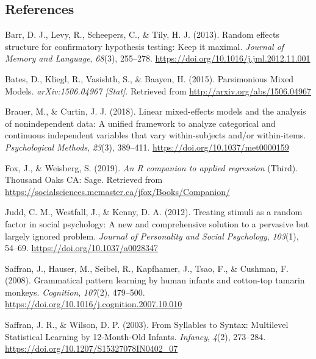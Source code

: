 \begin{appendix}
\hypertarget{references}{%
\subsection*{References}\label{references}}

\begingroup
\setlength{\parindent}{-0.5in}
\setlength{\leftskip}{0.5in}

\hypertarget{refs}{}
\leavevmode\hypertarget{ref-barr2013}{}%
Barr, D. J., Levy, R., Scheepers, C., \& Tily, H. J. (2013). Random
effects structure for confirmatory hypothesis testing: Keep it maximal.
\emph{Journal of Memory and Language}, \emph{68}(3), 255--278.
\url{https://doi.org/10.1016/j.jml.2012.11.001}

\leavevmode\hypertarget{ref-bates2015a}{}%
Bates, D., Kliegl, R., Vasishth, S., \& Baayen, H. (2015). Parsimonious
Mixed Models. \emph{arXiv:1506.04967 {[}Stat{]}}. Retrieved from
\url{http://arxiv.org/abs/1506.04967}

\leavevmode\hypertarget{ref-brauer2018}{}%
Brauer, M., \& Curtin, J. J. (2018). Linear mixed-effects models and the
analysis of nonindependent data: A unified framework to analyze
categorical and continuous independent variables that vary
within-subjects and/or within-items. \emph{Psychological Methods},
\emph{23}(3), 389--411. \url{https://doi.org/10.1037/met0000159}

\leavevmode\hypertarget{ref-fox2019}{}%
Fox, J., \& Weisberg, S. (2019). \emph{An R companion to applied
regression} (Third). Thousand Oaks CA: Sage. Retrieved from
\url{https://socialsciences.mcmaster.ca/jfox/Books/Companion/}

\leavevmode\hypertarget{ref-judd2012}{}%
Judd, C. M., Westfall, J., \& Kenny, D. A. (2012). Treating stimuli as a
random factor in social psychology: A new and comprehensive solution to
a pervasive but largely ignored problem. \emph{Journal of Personality
and Social Psychology}, \emph{103}(1), 54--69.
\url{https://doi.org/10.1037/a0028347}

\leavevmode\hypertarget{ref-saffran2008}{}%
Saffran, J., Hauser, M., Seibel, R., Kapfhamer, J., Tsao, F., \&
Cushman, F. (2008). Grammatical pattern learning by human infants and
cotton-top tamarin monkeys. \emph{Cognition}, \emph{107}(2), 479--500.
\url{https://doi.org/10.1016/j.cognition.2007.10.010}

\leavevmode\hypertarget{ref-saffran2003}{}%
Saffran, J. R., \& Wilson, D. P. (2003). From Syllables to Syntax:
Multilevel Statistical Learning by 12-Month-Old Infants. \emph{Infancy},
\emph{4}(2), 273--284. \url{https://doi.org/10.1207/S15327078IN0402_07}


\end{appendix}
